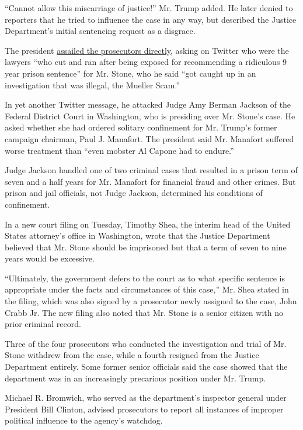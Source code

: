 ``Cannot allow this miscarriage of justice!'' Mr. Trump added. He later
denied to reporters that he tried to influence the case in any way, but
described the Justice Department's initial sentencing request as a
disgrace.

The president
\href{https://twitter.com/realDonaldTrump/status/1227423392078409728}{assailed
the prosecutors directly}, asking on Twitter who were the lawyers ``who
cut and ran after being exposed for recommending a ridiculous 9 year
prison sentence'' for Mr. Stone, who he said ``got caught up in an
investigation that was illegal, the Mueller Scam.''

In yet another Twitter message, he attacked Judge Amy Berman Jackson of
the Federal District Court in Washington, who is presiding over Mr.
Stone's case. He asked whether she had ordered solitary confinement for
Mr. Trump's former campaign chairman, Paul J. Manafort. The president
said Mr. Manafort suffered worse treatment than ``even mobster Al Capone
had to endure.''

Judge Jackson handled one of two criminal cases that resulted in a
prison term of seven and a half years for Mr. Manafort for financial
fraud and other crimes. But prison and jail officials, not Judge
Jackson, determined his conditions of confinement.

In a new court filing on Tuesday, Timothy Shea, the interim head of the
United States attorney's office in Washington, wrote that the Justice
Department believed that Mr. Stone should be imprisoned but that a term
of seven to nine years would be excessive.

``Ultimately, the government defers to the court as to what specific
sentence is appropriate under the facts and circumstances of this
case,'' Mr. Shea stated in the filing, which was also signed by a
prosecutor newly assigned to the case, John Crabb Jr. The new filing
also noted that Mr. Stone is a senior citizen with no prior criminal
record.

Three of the four prosecutors who conducted the investigation and trial
of Mr. Stone withdrew from the case, while a fourth resigned from the
Justice Department entirely. Some former senior officials said the case
showed that the department was in an increasingly precarious position
under Mr. Trump.

Michael R. Bromwich, who served as the department's inspector general
under President Bill Clinton, advised prosecutors to report all
instances of improper political influence to the agency's watchdog.

